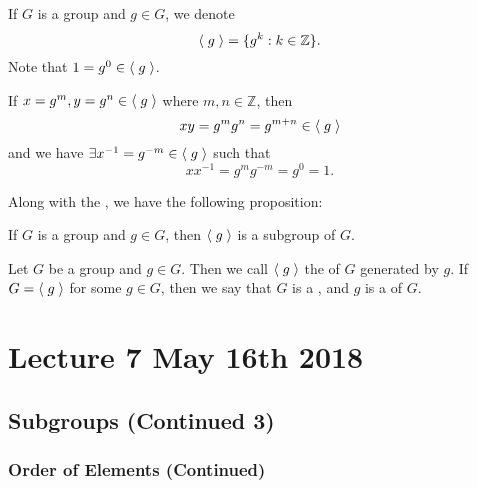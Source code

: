 \documentclass[notoc,notitlepage]{tufte-book}
\begin{document}
\begin{notation}
  If $G$ is a group and $g \in G$, we denote
  \begin{equation*}
    \langle \; g \; \rangle = \{ g^k : k \in \mathbb{Z} \}.
  \end{equation*}
  Note that $1 = g^0 \in \langle \; g \; \rangle$.

  If $x = g^m, y = g^n \in \langle \; g \; \rangle$ where $m, n \in \mathbb{Z}$, then
  \begin{equation*}
    xy = g^m g^n = g^{m + n} \in \langle \; g \; \rangle
  \end{equation*}
  and we have $\exists x^{-1} = g^{-m} \in \langle \; g \; \rangle$ such that
  \begin{equation*}
    xx^{-1} = g^m g^{-m} = g^0 = 1.
  \end{equation*}
\end{notation}

Along with the , we have the following proposition:

\begin{propo}\label{propo:cyclic_group_as_a_subgroup}
  If $G$ is a group and $g \in G$, then $\langle \; g \; \rangle$ is a subgroup of $G$.
\end{propo}

\begin{defn}\label{defn:cyclic_groups}
  Let $G$ be a group and $g \in G$. Then we call $\langle \; g \; \rangle$ the  of $G$ generated by $g$. If $G = \langle \; g \; \rangle$ for some $g \in G$, then we say that $G$ is a , and $g$ is a  of $G$.
\end{defn}




\chapter{Lecture 7 May 16th 2018}%
\label{chp:lecture_7_may_16th_2018}

\section{Subgroups (Continued 3)}%
\label{sec:subgroups_continued_3}

\subsection{Order of Elements (Continued)}%
\label{sub:order_of_elements_continued}
\end{document}
